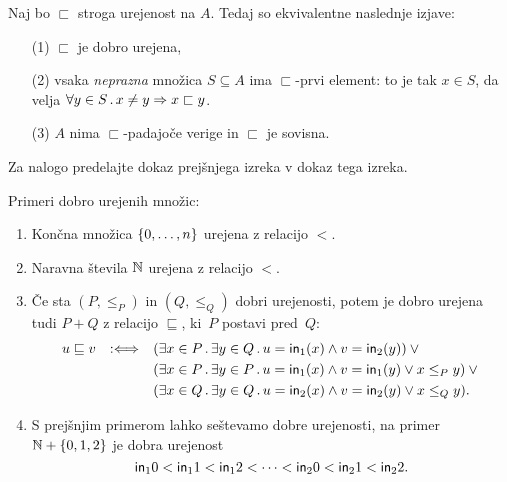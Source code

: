 \begin{izrek}
  \label{izr:dobra-urejenost-karakterizacija}
  Naj bo $\sqsubset$ stroga urejenost na $A$. Tedaj so ekvivalentne naslednje izjave:
  \begin{enumerate}
  \item[(1)] $\sqsubset$ je dobro urejena,
  \item[(2)] vsaka \emph{neprazna} množica $S \subseteq A$ ima $\sqsubset$-prvi element: to je tak $x \in S$, da velja
    $\forall y \in S \,.\, x \neq y \Rightarrow x \sqsubset y$.
  \item[(3)] $A$ nima $\sqsubset$-padajoče verige in $\sqsubset$ je sovisna.
  \end{enumerate}
\end{izrek}

\begin{dokaz}
  Za nalogo predelajte dokaz prejšnjega izreka v dokaz tega izreka.
\end{dokaz}

\begin{primer}
  Primeri dobro urejenih množic:
  \begin{enumerate}
  \item Končna množica $\left\{0, \ldots, n\right\}$ urejena z relacijo $<$.

  \item Naravna števila $\mathbb{N}$ urejena z relacijo $<$.

  \item Če sta $(P, \leq_P)$ in $(Q, \leq_Q)$ dobri urejenosti, potem je dobro urejena tudi $P + Q$ z relacijo
    $\sqsubseteq$, ki~$P$ postavi pred~$Q$:
    \begin{equation*}
      u \sqsubseteq v \quad {{:}{\Longleftrightarrow}}\quad
      \begin{aligned}[t]
        &(\exists x \in P \,.\, \exists y \in Q \,.\, u = \mathsf{in}_{1}(x) \land v = \mathsf{in}_{2}(y)) \lor {}\\
        &(\exists x \in P \,.\, \exists y \in P \,.\, u = \mathsf{in}_{1}(x) \land v = \mathsf{in}_{1}(y) \lor x \leq_P y) \lor {}\\
        &(\exists x \in Q \,.\, \exists y \in Q \,.\, u = \mathsf{in}_{2}(x) \land v = \mathsf{in}_{2}(y) \lor x \leq_Q y).
      \end{aligned}
    \end{equation*}

  \item
    S prejšnjim primerom lahko seštevamo dobre urejenosti, na primer $\mathbb{N} + \left\{0, 1, 2\right\}$ je dobra
    urejenost
    \begin{equation*}
      \mathsf{in}_{1}{0} < \mathsf{in}_{1}{1} < \mathsf{in}_{1}{2} < \cdots < \mathsf{in}_{2}{0} < \mathsf{in}_{2}{1} < \mathsf{in}_{2}{2}.
    \end{equation*}
  \end{enumerate}
\end{primer}


